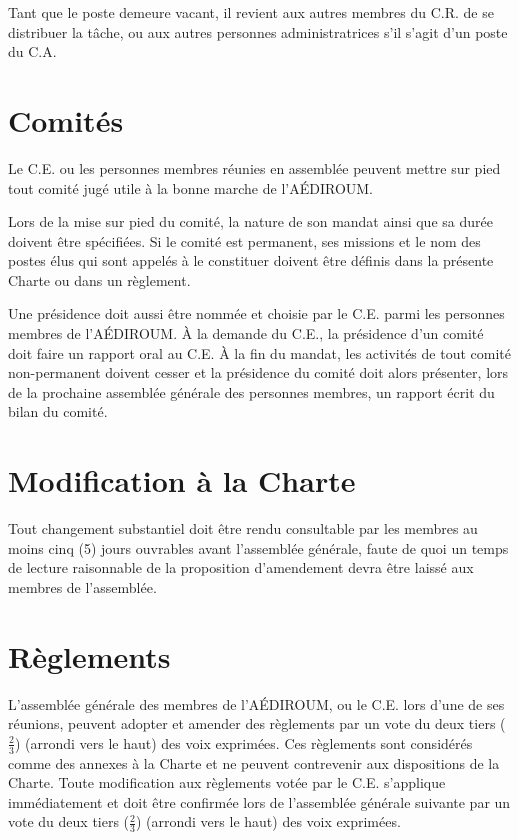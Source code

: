 \documentclass{aediroum}
\begin{document}
Tant que le poste demeure vacant, il revient aux autres membres du C.R. de se distribuer la tâche, ou aux autres personnes administratrices s'il s'agit d'un poste du C.A.

\section{Comités}\label{sec:comites}

Le C.E. ou les personnes membres réunies en assemblée peuvent mettre sur pied tout comité jugé utile à la bonne marche de l'AÉDIROUM.

Lors de la mise sur pied du comité, la nature de son mandat ainsi que sa durée doivent être spécifiées. Si le comité est permanent, ses missions et le nom des postes élus qui sont appelés à le constituer doivent être définis dans la présente Charte ou dans un règlement.

Une présidence doit aussi être nommée et choisie par le C.E. parmi les personnes membres de l'AÉDIROUM. À la demande du C.E., la présidence d'un comité doit faire un rapport oral au C.E. À la fin du mandat, les activités de tout comité non-permanent
doivent cesser et la présidence du comité doit alors présenter, lors de la prochaine assemblée générale des personnes membres, un rapport écrit du bilan du comité.

\section{Modification à la Charte}\label{sec:modification-a-la-charte}

Tout changement substantiel doit être rendu consultable par les membres au moins
cinq (5) jours ouvrables avant l’assemblée générale, faute de quoi un temps de lecture
raisonnable de la proposition d’amendement devra être laissé aux membres de l’assemblée.

\section{Règlements}
\label{sec:reglements}
L’assemblée générale des membres de l’AÉDIROUM, ou le C.E. lors d’une de ses réunions, peuvent adopter et amender des règlements par un vote du deux tiers ($\frac{2}{3}$) (arrondi vers le haut) des voix exprimées. Ces règlements sont considérés comme des annexes à la Charte et ne peuvent contrevenir aux dispositions de la Charte. Toute modification aux règlements votée par le C.E. s’applique immédiatement et doit être confirmée lors de l’assemblée générale suivante par un vote du deux tiers ($\frac{2}{3}$) (arrondi vers le haut) des voix exprimées.
\end{document}
